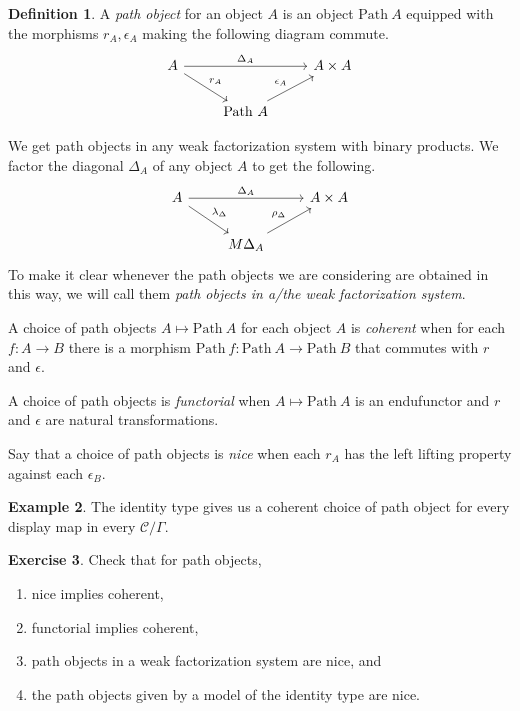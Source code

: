 \documentclass{article}
\theoremstyle{definition}
\newtheorem{definition}{Definition}[section]
\newtheorem{exercise}[definition]{Exercise}
\newtheorem{example}[definition]{Example}
\newcommand{\C}{\mathcal C}
\newcommand{\Path}{\mathrm {Path} \ }
\begin{document}
\begin{definition}
    A \emph{path object} for an object $A$ is an object $\Path A$ equipped with the morphisms $r_A, \epsilon_A$ making the following diagram commute.
    \[
             \begin{tikzcd}
                 A \ar[dr, "r_A"] \ar[rr,"\Delta_A"]& & A \times A \\
                   & \Path A \ar[ur,"\epsilon_A"]
             \end{tikzcd}
        \]

    We get path objects in any weak factorization system with binary products. We factor the diagonal $\Delta_A$ of any object $A$ to get the following.
    \[
             \begin{tikzcd}
                 A \ar[dr, "\lambda_\Delta"] \ar[rr,"\Delta_A"]& & A \times A \\
                   & M\Delta_A \ar[ur,"\rho_\Delta"]
             \end{tikzcd}
        \]
    To make it clear whenever the path objects we are considering are obtained in this way, we will call them \emph{path objects in a/the weak factorization system}.

    A choice of path objects $A \mapsto \Path A$ for each object $A$ is \emph{coherent} when for each $f: A \to B$ there is a morphism $\Path f : \Path A \to \Path B$ that commutes with $r$ and $\epsilon$.

    A choice of path objects is \emph{functorial} when $A \mapsto \Path A$ is an endufunctor and $r$ and $\epsilon$ are natural transformations.

    Say that a choice of path objects is \emph{nice} when each $r_A$ has the left lifting property against each $\epsilon_B$.
\end{definition}

\begin{example}
    The identity type gives us a coherent choice of path object for every display map in every $\C / \Gamma$.
\end{example}

\begin{exercise}
    Check that for path objects,
    \begin{enumerate}
        \item nice implies coherent,
        \item functorial implies coherent,
        \item path objects in a weak factorization system are nice, and
        \item the path objects given by a model of the identity type are nice.
    \end{enumerate}
\end{exercise}
\end{document}
